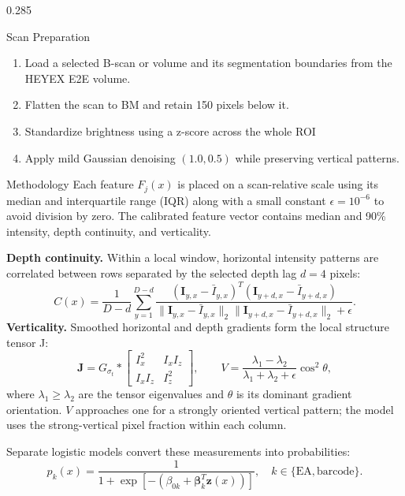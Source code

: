 \documentclass[final]{beamer}
\begin{document}
\begin{frame}[t]
\begin{columns}[t,totalwidth=\dimexpr\paperwidth-4cm\relax]
\begin{column}{0.285\textwidth}
  \begin{block}{Scan Preparation}
    \begin{enumerate}
      \item Load a selected B-scan or volume and its segmentation
      boundaries from the HEYEX E2E volume.
      \item Flatten the scan to BM and retain 150 pixels below it.
      \item Standardize brightness using a z-score across the whole ROI
      \item Apply mild Gaussian denoising $(1.0,0.5)$ while preserving vertical
      patterns.
    \end{enumerate}
  \end{block}

  \begin{block}{Methodology}
    Each feature $F_j(x)$ is placed on a scan-relative scale using its median
    and interquartile range (IQR) along with a small constant $\epsilon=10^{-6}$ to avoid division by zero.
    The calibrated feature vector contains median and 90\% intensity, depth continuity, and verticality.

    \textbf{Depth continuity.} Within a local window, horizontal intensity
    patterns are correlated between rows separated by the selected depth lag
    $d=4$ pixels:
    \[
      C(x)=\frac{1}{D-d}\sum_{y=1}^{D-d}
      \frac{(\mathbf I_{y,x}-\bar I_{y,x})^T
      (\mathbf I_{y+d,x}-\bar I_{y+d,x})}
      {\|\mathbf I_{y,x}-\bar I_{y,x}\|_2
       \|\mathbf I_{y+d,x}-\bar I_{y+d,x}\|_2+\epsilon}.
    \]
    \textbf{Verticality.} Smoothed horizontal and depth gradients form the
    local structure tensor J:
    \[
      \mathbf J=G_{\sigma_t}*\begin{bmatrix}I_x^2&I_xI_z\\I_xI_z&I_z^2\end{bmatrix},
      \qquad
      V=\frac{\lambda_1-\lambda_2}{\lambda_1+\lambda_2+\epsilon}\cos^2\theta,
    \]
    where $\lambda_1\geq\lambda_2$ are the tensor eigenvalues and $\theta$ is
    its dominant gradient orientation. $V$ approaches one for a strongly
    oriented vertical pattern; the model uses the strong-vertical pixel
    fraction within each column.

    Separate logistic models convert these measurements into probabilities:
    \[
      p_k(x)=\frac{1}{1+\exp[-(\beta_{0k}+\boldsymbol\beta_k^T
      \mathbf z(x))]},\quad k\in\{\mathrm{EA},\mathrm{barcode}\}.
    \]
  \end{block}
\end{column}


\end{columns}
\end{frame}
\end{document}
